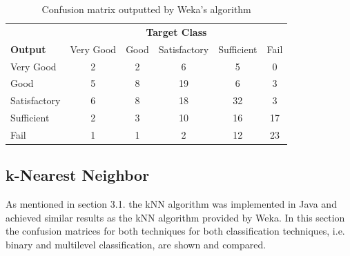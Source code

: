 \begin{table}[h]
  \begin{tabular}{l|ccccc}
     & \multicolumn{5}{c}{\textbf{Target Class}} \\ 
  \textbf{Output} & Very Good & Good & Satisfactory & Sufficient & Fail \\  \hline
  Very Good  & 2 & 2 & 6 & 5 & 0\\
     Good & 5 & 8 & 19 & 6 & 3\\
     Satisfactory & 6 & 8 & 18 & 32 & 3\\
     Sufficient & 2 & 3 & 10 & 16 & 17\\
     Fail & 1 & 1 & 2 & 12 & 23\\
  \end{tabular}
  \caption{Confusion matrix outputted by Weka's algorithm}
  \label{tab:kNNmultiWeka}
\end{table}

\subsection{k-Nearest Neighbor}
As mentioned in section 3.1. the kNN algorithm was implemented in Java and achieved similar results as the kNN algorithm provided by Weka. In this section the confusion matrices for both techniques for both classification techniques, i.e. binary and multilevel classification, are shown and compared. 
